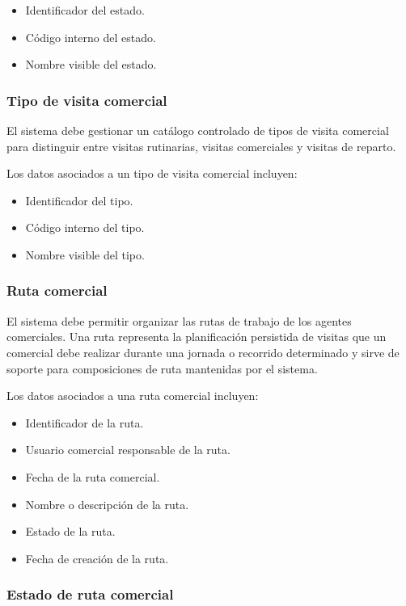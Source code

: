 \begin{itemize}
    \item Identificador del estado.
    \item Código interno del estado.
    \item Nombre visible del estado.
\end{itemize}

\subsubsection*{Tipo de visita comercial}

El sistema debe gestionar un catálogo controlado de tipos de visita comercial para distinguir entre visitas rutinarias, visitas comerciales y visitas de reparto.

Los datos asociados a un tipo de visita comercial incluyen:

\begin{itemize}
    \item Identificador del tipo.
    \item Código interno del tipo.
    \item Nombre visible del tipo.
\end{itemize}

\subsubsection*{Ruta comercial}

El sistema debe permitir organizar las rutas de trabajo de los agentes comerciales. Una ruta representa la planificación persistida de visitas que un comercial debe realizar durante una jornada o recorrido determinado y sirve de soporte para composiciones de ruta mantenidas por el sistema.

Los datos asociados a una ruta comercial incluyen:

\begin{itemize}
    \item Identificador de la ruta.
    \item Usuario comercial responsable de la ruta.
    \item Fecha de la ruta comercial.
    \item Nombre o descripción de la ruta.
    \item Estado de la ruta.
    \item Fecha de creación de la ruta.
\end{itemize}

\subsubsection*{Estado de ruta comercial}

